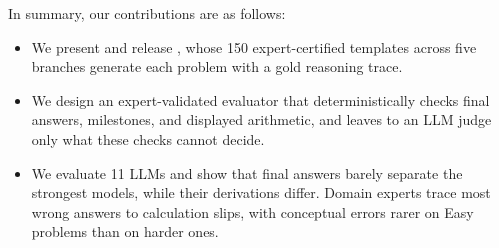 In summary, our contributions are as follows:
\begin{itemize}
    \item We present and release \ourdataset, whose 150 expert-certified templates across five
          branches generate each problem with a gold reasoning trace.
    \item We design an expert-validated evaluator that deterministically checks final answers,
          milestones, and displayed arithmetic, and leaves to an LLM judge only what these checks
          cannot decide.
    \item We evaluate 11 LLMs and show that final answers barely separate the strongest models,
          while their derivations differ.
          Domain experts trace most wrong answers to calculation slips, with conceptual errors
          rarer on Easy problems than on harder ones.
\end{itemize}
